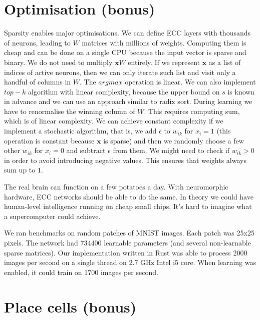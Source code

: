 \documentclass[12pt]{article}
\begin{document}
\section{Optimisation (bonus)}

Sparsity enables major optimisations. We can define ECC layers with thousands of neurons, leading to $W$ matrices with millions of weights. Computing them is cheap and can be done on a single CPU because the input vector is sparse and binary. We do not need to multiply $\boldsymbol{x}W$ entirely. If we represent $\boldsymbol{x}$ as a list of indices of active neurons, then we can only iterate such list and visit only a handful of columns in $W$. The $argmax$ operation is linear. We can also implement $top-k$ algorithm with linear complexity, because the upper bound on $s$ is known in advance and we can use an approach similar to radix sort. During learning we have to renormalise the winning column of $W$. This requires computing sum, which is of linear complexity. We can achieve constant complexity if we implement a stochastic algorithm, that is, we add $\epsilon$ to $w_{ik}$ for $x_i=1$ (this operation is constant because $\boldsymbol{x}$ is sparse) and then we randomly choose a few other $w_{ik}$ for $x_i=0$ and subtract $\epsilon$ from them. We might need to check if $w_{ik}>0$ in order to avoid introducing negative values. This ensures that weights always sum up to $1$.

The real brain can function on a few potatoes a day. With neuromorphic hardware, ECC networks should be able to do the same. In theory we could have human-level intelligence running on cheap small chips. It's hard to imagine what a supercomputer could achieve.

We ran benchmarks on random patches of MNIST images. Each patch was 25x25 pixels. The network had 734400 learnable parameters (and several non-learnable sparse matrices). Our implementation written in Rust was able to process 2000 images per second on a single thread on 2.7 GHz Intel i5 core. When learning was enabled, it could train on 1700 images per second.

\section{Place cells (bonus)}
\end{document}
